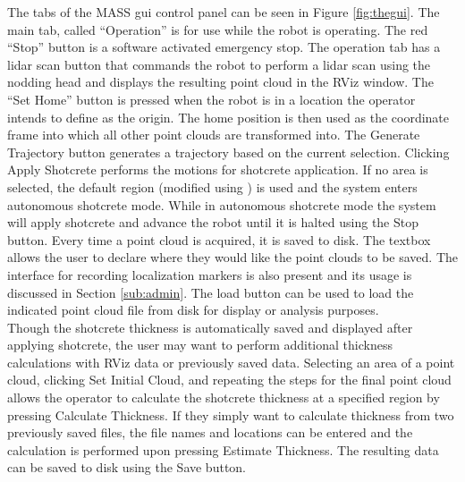 The tabs of the MASS \acrshort{gui} control panel can be seen in Figure \ref{fig:thegui}. The main tab, called ``Operation'' is for use while the robot is operating. The red ``Stop'' button is a software activated emergency stop. The operation tab has a \acrshort{lidar} scan button that commands the robot to perform a \acrshort{lidar} scan using the nodding head and displays the resulting point cloud in the RViz window. The ``Set Home'' button is pressed when the robot is in a location the operator intends to define as the origin. The home position is then used as the coordinate frame into which all other point clouds are transformed into. The Generate Trajectory button generates a trajectory based on the current selection. Clicking Apply Shotcrete performs the motions for shotcrete application. If no area is selected, the default region (modified using ) is used and the system enters autonomous shotcrete mode. While in autonomous shotcrete mode the system will apply shotcrete and advance the robot until it is halted using the Stop button. Every time a point cloud is acquired, it is saved to disk. The textbox allows the user to declare where they would like the point clouds to be saved. The interface for recording localization markers is also present and its usage is discussed in Section \ref{sub:admin}. The load button can be used to load the indicated point cloud file from disk for display or analysis purposes.\\

Though the shotcrete thickness is automatically saved and displayed after applying shotcrete, the user may want to perform additional thickness calculations with RViz data or previously saved data. Selecting an area of a point cloud, clicking Set Initial Cloud, and repeating the steps for the final point cloud allows the operator to calculate the shotcrete thickness at a specified region by pressing Calculate Thickness. If they simply want to calculate thickness from two previously saved files, the file names and locations can be entered and the calculation is performed upon pressing Estimate Thickness. The resulting data can be saved to disk using the Save button.\\

